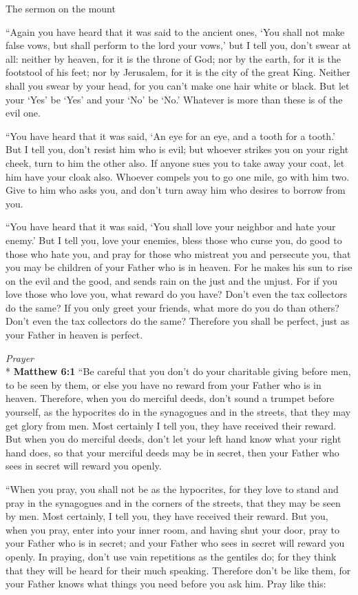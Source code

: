 \documentclass[10pt,twoside]{article} %
\newcommand{\quotesize}{\normalsize{}}
\newenvironment{quotetext}{\begingroup\quotesize}{\endgroup}
\newcommand{\intex}[1]{\index[texts]{#1}}
\newcommand{\bible}[2]{\begin{quotetext}\textbf{#1}\intex{#1} #2\end{quotetext}}
\newcommand{\matthew}[2]{\bible{Matthew #1}{#2}}
\newcommand{\subhead}[1]{\emph{#1}\\*}
\begin{document}
\begin{section}{The sermon on the mount}
{   ``Again you have heard that it was said to the ancient ones, `You shall not make false vows, but shall perform to the lord your vows,'    but I tell you, don't swear at all: neither by heaven, for it is the throne of God;    nor by the earth, for it is the footstool of his feet; nor by Jerusalem, for it is the city of the great King.    Neither shall you swear by your head, for you can't make one hair white or black.    But let your `Yes' be `Yes' and your `No' be `No.' Whatever is more than these is of the evil one.

   ``You have heard that it was said, `An eye for an eye, and a tooth for a tooth.'    But I tell you, don't resist him who is evil; but whoever strikes you on your right cheek, turn to him the other also.    If anyone sues you to take away your coat, let him have your cloak also.    Whoever compels you to go one mile, go with him two.    Give to him who asks you, and don't turn away him who desires to borrow from you.

   ``You have heard that it was said, `You shall love your neighbor  and hate your enemy.'    But I tell you, love your enemies, bless those who curse you, do good to those who hate you, and pray for those who mistreat you and persecute you,    that you may be children of your Father who is in heaven. For he makes his sun to rise on the evil and the good, and sends rain on the just and the unjust.    For if you love those who love you, what reward do you have? Don't even the tax collectors do the same?    If you only greet your friends, what more do you do than others? Don't even the tax collectors do the same?    Therefore you shall be perfect, just as your Father in heaven is perfect.
}

\subhead{Prayer}
\matthew{6:1}{
    ``Be careful that you don't do your charitable giving before men, to be seen by them, or else you have no reward from your Father who is in heaven.    Therefore, when you do merciful deeds, don't sound a trumpet before yourself, as the hypocrites do in the synagogues and in the streets, that they may get glory from men. Most certainly I tell you, they have received their reward.    But when you do merciful deeds, don't let your left hand know what your right hand does,    so that your merciful deeds may be in secret, then your Father who sees in secret will reward you openly.

   ``When you pray, you shall not be as the hypocrites, for they love to stand and pray in the synagogues and in the corners of the streets, that they may be seen by men. Most certainly, I tell you, they have received their reward.    But you, when you pray, enter into your inner room, and having shut your door, pray to your Father who is in secret; and your Father who sees in secret will reward you openly.    In praying, don't use vain repetitions as the gentiles do; for they think that they will be heard for their much speaking.    Therefore don't be like them, for your Father knows what things you need before you ask him.    Pray like this:
}


\end{section}
\end{document}
